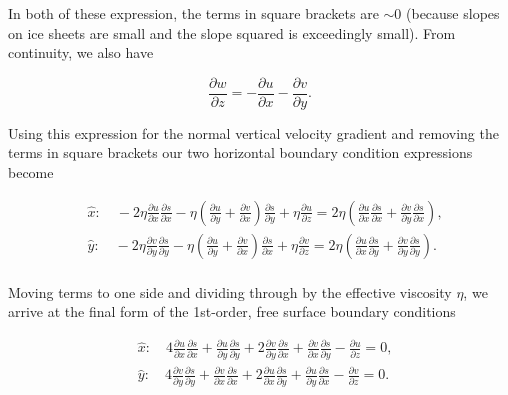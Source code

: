 In both of these expression, the terms in square brackets are $\sim{0}$ (because slopes on ice sheets are small and the slope squared is exceedingly small). From continuity, we also have

\begin{equation}
\frac{\partial w}{\partial z}=-\frac{\partial u}{\partial x}-\frac{\partial v}{\partial y}.
\end{equation}

Using this expression for the normal vertical velocity gradient and removing the terms in square brackets our two horizontal boundary condition expressions become

\begin{equation}
\begin{split}
   {} & \hat{x}:\quad -2\eta \frac{\partial u}{\partial x}\frac{\partial s}{\partial x}-\eta \left( \frac{\partial u}{\partial y}+\frac{\partial v}{\partial x} \right)\frac{\partial s}{\partial y}+\eta \frac{\partial u}{\partial z}=2\eta \left( \frac{\partial u}{\partial x}\frac{\partial s}{\partial x}+\frac{\partial v}{\partial y}\frac{\partial s}{\partial x} \right),  \\
   {} & \hat{y}:\quad -2\eta \frac{\partial v}{\partial y}\frac{\partial s}{\partial y}-\eta \left( \frac{\partial u}{\partial y}+\frac{\partial v}{\partial x} \right)\frac{\partial s}{\partial x}+\eta \frac{\partial v}{\partial z}=2\eta \left( \frac{\partial u}{\partial x}\frac{\partial s}{\partial y}+\frac{\partial v}{\partial y}\frac{\partial s}{\partial y} \right).  \\
\end{split}
\end{equation}

Moving terms to one side and dividing through by the effective viscosity \textit{\(\eta{}\)}, we arrive at the final form of the 1st-order, free surface boundary conditions

\begin{equation}
\begin{split}
   {} & \hat{x}:\quad 4\frac{\partial u}{\partial x}\frac{\partial s}{\partial x}+\frac{\partial u}{\partial y}\frac{\partial s}{\partial y}+2\frac{\partial v}{\partial y}\frac{\partial s}{\partial x}+\frac{\partial v}{\partial x}\frac{\partial s}{\partial y}-\frac{\partial u}{\partial z}=0,  \\
   {} & \hat{y}:\quad 4\frac{\partial v}{\partial y}\frac{\partial s}{\partial y}+\frac{\partial v}{\partial x}\frac{\partial s}{\partial x}+2\frac{\partial u}{\partial x}\frac{\partial s}{\partial y}+\frac{\partial u}{\partial y}\frac{\partial s}{\partial x}-\frac{\partial v}{\partial z}=0.  \\
\end{split}
\end{equation}

